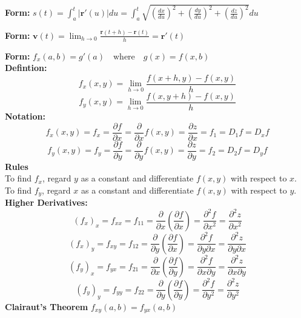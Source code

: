 \documentclass[2pt]{article}
\begin{document}
\begin{multicols}{2}
\begin{tcolorbox}[title=\textbf{Curvature}, colframe=lightblue]
    \textbf{Form:} 	$ s(t) = \int_{a}^{t} |\mathbf{r}'(u)| du = \int_{a}^{t} \sqrt{\left(\frac{dx}{du}\right)^{2} + \left(\frac{dy}{du}\right)^{2} + \left(\frac{dz}{du}\right)^{2}} du $ 
\end{tcolorbox}

\begin{tcolorbox}[title=\textbf{Motion in space}, colframe=lightblue]
    \textbf{Form:} 	$ \mathbf{v}(t) = \lim_{{h \to 0}} \frac{\mathbf{r}(t + h) - \mathbf{r}(t)}{h} = \mathbf{r}'(t) $ 
\end{tcolorbox}

\begin{tcolorbox}[title=\textbf{Partial Derivatives}, colframe=lightblue]
    \textbf{Form:} 	$ f_x(a, b) = g'(a) \quad \text{where} \quad g(x) = f(x, b) $ \\
    \textbf{Defintion:} 
    \[f_x(x, y) = \lim_{{h \to 0}} \frac{f(x + h, y) - f(x, y)}{h}\]
    \[f_y(x, y) = \lim_{{h \to 0}} \frac{f(x, y + h) - f(x, y)}{h}\]
    \textbf{Notation:} 
    \[ f_x(x, y) = f_x = \frac{\partial f}{\partial x} = \frac{\partial}{\partial x} f(x, y) = \frac{\partial z}{\partial x} = f_1 = D_1 f = D_x f \]
    \[ f_y(x, y) = f_y = \frac{\partial f}{\partial y} = \frac{\partial}{\partial y} f(x, y) = \frac{\partial z}{\partial y} = f_2 = D_2 f = D_y f \]
    \textbf{Rules} \\
    To find $f_x$, regard $y$ as a constant and differentiate $f(x, y)$ with respect to $x$.\\
    To find $f_y$, regard $x$ as a constant and differentiate $f(x, y)$ with respect to $y$. \\
    \textbf{Higher Derivatives:}
    \[(f_x)_x = f_{xx} = f_{11} = \frac{\partial}{\partial x} \left( \frac{\partial f}{\partial x} \right) = \frac{\partial^2 f}{\partial x^2} = \frac{\partial^2 z}{\partial x^2}\]
    \[(f_x)_y = f_{xy} = f_{12} = \frac{\partial}{\partial y} \left( \frac{\partial f}{\partial x} \right) = \frac{\partial^2 f}{\partial y \partial x} = \frac{\partial^2 z}{\partial y \partial x} \]
    \[ (f_y)_x = f_{yx} = f_{21} = \frac{\partial}{\partial x} \left( \frac{\partial f}{\partial y} \right) = \frac{\partial^2 f}{\partial x \partial y} = \frac{\partial^2 z}{\partial x \partial y} \]
    \[(f_y)_y = f_{yy} = f_{22} = \frac{\partial}{\partial y} \left( \frac{\partial f}{\partial y} \right) = \frac{\partial^2 f}{\partial y^2} = \frac{\partial^2 z}{\partial y^2} \]
    \textbf{Clairaut's Theorem} $ f_{xy}(a, b) = f_{yx}(a, b) $
\end{tcolorbox}


\end{multicols}
\end{document}

